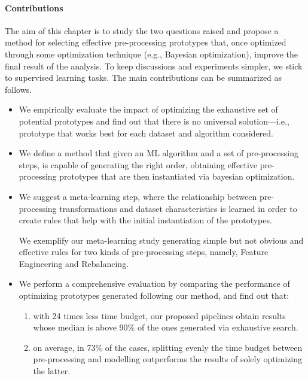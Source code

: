 \paragraph{Contributions} The aim of this chapter is to study the two questions raised and propose a method for selecting effective pre-processing prototypes that, once optimized through some optimization technique (e.g., Bayesian optimization), improve the final result of the analysis.
To keep discussions and experiments simpler, we stick to supervised learning tasks.
The main contributions can be summarized as follows.
\begin{itemize}
    \item We empirically evaluate the impact of optimizing the exhaustive set of potential prototypes and find out that
	there is no universal solution---i.e., prototype that works best for each dataset and algorithm considered.
    \item We define a method that given an ML algorithm and a set of pre-processing steps, is capable of generating the right order, obtaining effective pre-processing prototypes that are then instantiated via bayesian optimization.
    \item We suggest a meta-learning step, where the relationship between pre-processing transformations and dataset characteristics is learned in order to create rules that help with the initial instantiation of the prototypes.

	We exemplify our meta-learning study generating simple but not obvious and effective rules for two kinds of pre-processing steps, namely, Feature Engineering and Rebalancing.

    \item We perform a comprehensive evaluation by comparing the performance of optimizing prototypes generated following our method, and find out that:
    \begin{enumerate}
        \item with 24 times less time budget, our proposed pipelines obtain results whose median is above 90\% of the ones generated via exhaustive search.
        \item on average, in 73\% of the cases, splitting evenly the time budget between pre-processing and modelling outperforms the results of solely optimizing the latter.
    \end{enumerate}
\end{itemize}

